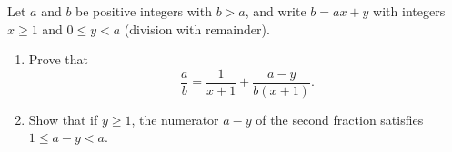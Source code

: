 Let $a$ and $b$ be positive integers with $b>a$, and write $b=ax+y$ with integers $x\ge1$ and $0\le y<a$ (division with remainder).
\begin{enumerate}
\item[(a)] Prove that
\[
\dfrac {a}{b}=\dfrac{1}{x+1}+\dfrac{a-y}{b(x+1)}.
\]
\item[(b)] Show that if $y\ge1$, the numerator $a-y$ of the second fraction satisfies $1\le a-y<a$.
\end{enumerate}

